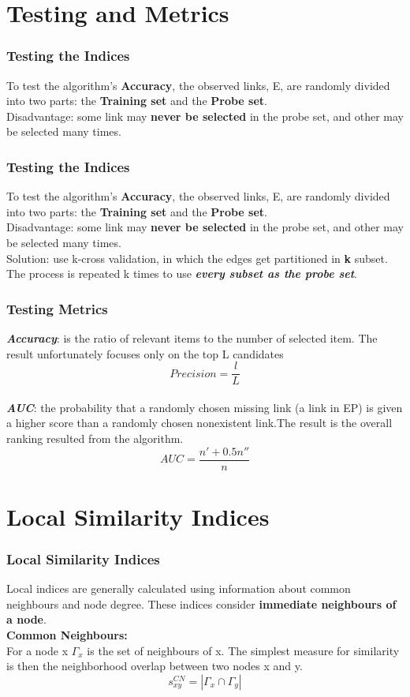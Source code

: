 \documentclass{beamer}
\begin{document}
\section{Testing and Metrics}
\begin{frame}
  \frametitle{Testing the Indices}
To test the algorithm’s \textbf{Accuracy}, the observed links, E, are randomly divided into two parts: the \textbf{Training set} and the \textbf{Probe set}. \\%
\smallskip
\color{purple}Disadvantage: \color{black} some link may \textbf{never be selected} in the probe set, and other may be selected many times.
\end{frame}

\begin{frame}
  \frametitle{Testing the Indices}
To test the algorithm’s \textbf{Accuracy}, the observed links, E, are randomly divided into two parts: the \textbf{Training set} and the \textbf{Probe set}. \\%
\smallskip
\color{purple}Disadvantage: \color{black} some link may \textbf{never be selected} in the probe set, and other may be selected many times.\\
\medskip
\color{teal}Solution: \color{black} use k-cross validation, in which the edges get partitioned in \textbf{k} subset. The process is repeated k times to use \emph{\textbf{every subset as the probe set}}.
\end{frame}
\begin{frame}
  \frametitle{Testing Metrics}
  \emph{\textbf{Accuracy}}: is the ratio of relevant items
to the number of selected item. The result unfortunately focuses only on the top L candidates\\
    \[Precision = \dfrac{l}{L}\] \\
  \bigskip 
  \emph{\textbf{AUC}}: the probability that a randomly chosen missing link (a link in EP) is given a higher score than a randomly chosen nonexistent link.The result is the overall ranking resulted from the algorithm. \\
   \[AUC = \dfrac{n' + 0.5n''}{n}\]
\end{frame}

\section{Local Similarity Indices}
\begin{frame}
\frametitle{Local Similarity Indices}
Local indices are generally calculated using information about common neighbours and node degree. These indices consider \textbf{immediate neighbours of a node}.\\
\bigskip
\textbf{Common Neighbours:} \\
For a node x $\Gamma_{x}$ is the set of neighbours of x. The simplest measure for similarity is then the neighborhood overlap between two nodes x and y.
\[s^{CN}_{xy} = |\Gamma_{x} \cap \Gamma_{y}| \]
\end{frame}
\end{document}
